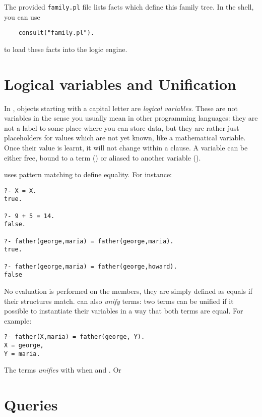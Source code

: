 \documentclass{../../../tp}
\begin{document}
The provided \verb|family.pl| file lists facts which define this family tree. In the \prolog shell, you can use

\begin{verbatim}
	consult("family.pl").
\end{verbatim} 

to load these facts into the logic engine.

\section{Logical variables and Unification}

In \prolog, objects starting with a capital letter are \emph{logical variables}. These are not variables in the sense you usually mean in other programming languages: they are not a label to some place where you can store data, but they are rather just placeholders for values which are not yet known, like a mathematical variable. Once their value is learnt, it will not change within a clause. A variable can be either free, bound to a term () or aliased to another variable ().

\prolog uses pattern matching to define equality. For instance: 

\begin{verbatim}
?- X = X.
true.

?- 9 + 5 = 14.
false.

?- father(george,maria) = father(george,maria).
true.

?- father(george,maria) = father(george,howard).
false
\end{verbatim} 

No evaluation is performed on the members, they are simply defined as equals if their structures match. \prolog can also \emph{unify} terms: two terms can be unified if it possible to instantiate their variables in a way that both terms are equal. For example:


\begin{verbatim}
?- father(X,maria) = father(george, Y).
X = george,
Y = maria.
\end{verbatim} 

The terms  \emph{unifies} with  when  and . Or 
 
\section{Queries}
 
\end{document}
